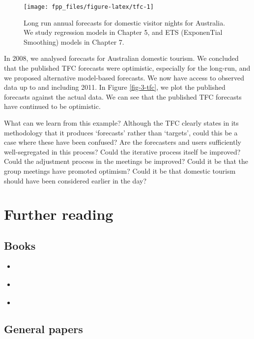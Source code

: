 \documentclass[]{book}
\providecommand{\tightlist}{%
  \setlength{\itemsep}{0pt}\setlength{\parskip}{0pt}}
\begin{document}
\begin{figure}

{\centering \texttt{[image: fpp\_files/figure-latex/tfc-1]} 

}

\caption{Long run annual forecasts for domestic visitor nights for Australia. We study regression models in Chapter 5, and ETS (ExponenTial Smoothing) models in Chapter 7.}\label{fig:tfc}
\end{figure}

In 2008, we \citep{austourism} analysed forecasts for Australian domestic tourism. We concluded that the published TFC forecasts were optimistic, especially for the long-run, and we proposed alternative model-based forecasts. We now have access to observed data up to and including 2011. In Figure \ref{fig-3-tfc}, we plot the published forecasts against the actual data. We can see that the published TFC forecasts have continued to be optimistic.

What can we learn from this example? Although the TFC clearly states in its methodology that it produces `forecasts' rather than `targets', could this be a case where these have been confused? Are the forecasters and users sufficiently well-segregated in this process? Could the iterative process itself be improved? Could the adjustment process in the meetings be improved? Could it be that the group meetings have promoted optimism? Could it be that domestic tourism should have been considered earlier in the day?

\hypertarget{further-reading-3}{%
\section{Further reading}\label{further-reading-3}}

\hypertarget{books}{%
\subsection*{Books}\label{books}}

\begin{itemize}
\tightlist
\item
  \citet{Ord2012}
\item
  \citet{GW04}
\item
  \citet{Kahn2006}
\end{itemize}

\hypertarget{general-papers}{%
\subsection*{General papers}\label{general-papers}}
\end{document}
